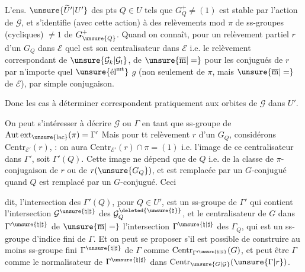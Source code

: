 
L'ens. $\unsure{\widetilde U'|U'}$ des pts $Q\in U$ tels que $G_Q^+\ne(1)$ est stable par l'action de $\mathcal G$, et s'identifie (avec cette action) à  des relèvements  mod $\pi$ de ss-groupes (cycliques) $\ne1$ de $G_{\unsure{Q}}^+$. Quand on connaît, pour un relèvement partiel $r$ d'un $G_Q$ dans $\mathcal E$ quel est son centralisateur dans $\mathcal E$ i.e. le relèvement correspondant de $\unsure{\mathcal G_k|\mathcal G_l}$,  de $\unsure{\overline{\mathrm m}|=}$ pour les conjugués de $r$ par n'importe quel $\unsure{\text{él}^{\mathrm{mt}}}$ $g$ (non seulement de $\pi$, mais $\unsure{\overline{\mathrm m}|=}$ de $\mathcal E$), par simple conjugaison.

Donc les cas à déterminer correspondent pratiquement aux orbites de $\mathcal G$ dans $U'$.

On peut s'intéresser à décrire $\mathcal G$ ou $\Gamma$ en tant que ss-groupe de $\mathrm{Aut\,ext}_{\unsure{\mathrm{lac}}}(\pi)=\Gamma'$  Mais pour tt relèvement $r$ d'un $G_Q$, considérons $\mathrm{Centr}_{\mathcal E'}(r)$,  : on aura $\mathrm{Centr}_{\mathcal E'}(r)\cap\pi=(1)$ i.e.  l'image de ce centralisateur dans $\Gamma'$, soit $\Gamma'(Q)$. Cette image ne dépend que de $Q$ i.e. de la classe de $\pi$-conjugaison de $r$ ou de $r(\unsure{G_Q})$, et est remplacée par un $G$-conjugué quand $Q$ est remplacé par un $G$-conjugué. Ceci



dit, l'intersection  des $\Gamma'(Q)$, pour $Q\in U'$, est un ss-groupe de $\Gamma'$ qui contient l'intersection  $\mathcal G^{\unsure{\natural|\sharp}}$ des $\mathcal G_Q^{\deleted{\unsure{\natural}}}$, et le centralisateur de $G$ dans $\Gamma'^{\unsure{\natural|\sharp}}$  de $\unsure{\overline{\mathrm m}|=}$ l'intersection  $\Gamma^{\unsure{\natural|\sharp}}$ des $\Gamma_Q$, qui est un ss-groupe  d'indice fini de $\Gamma$. Et on peut  se proposer s'il est possible de construire au moins  ss-groupe fini $\Gamma^{\unsure{\natural|\sharp}}$ de $\Gamma$ comme $\mathrm{Centr}_{\Gamma'^{\unsure{\natural|\sharp}}}(G)$, et  peut être $\Gamma$ comme le normalisateur de $\Gamma^{\unsure{\natural|\sharp}}$ dans  $\mathrm{Centr}_{\unsure{G|\mathcal G}}(\unsure{\Gamma|r})$.

